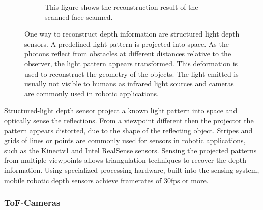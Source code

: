 \begin{figure}[H]
\begin{subfigure}[t]{0.45\textwidth}
        \caption{This figure shows the reconstruction result of the scanned face scanned\cite{sl_depthsensor_calibration}.}
    \end{subfigure}
    \caption[Demonstration of visible light patterns used for structured-light depth sensors]{One way to reconstruct depth information are structured light depth sensors. A predefined light pattern is projected into space. As the photons reflect from obstacles at different distances relative to the observer, the light pattern appears transformed. This deformation is used to reconstruct the geometry of the objects. The light emitted is usually not visible to humans as infrared light sources and cameras are commonly used in robotic applications.\label{fig:sl_face}}
\end{figure}
Structured-light depth sensor project a known light pattern into space and optically sense the reflections.
From a viewpoint different then the projector the pattern appears distorted, due to the shape of the reflecting object.
Stripes and grids of lines or points are commonly used for sensors in robotic applications, such as the Kinectv1 and Intel RealSense sensors.
Sensing the projected patterns from multiple viewpoints allows triangulation techniques to recover the depth information.
Using specialized processing hardware, built into the sensing system, mobile robotic depth sensors achieve framerates of 30fps or more.

\subsubsection{\acrlong{ToF}-Cameras}

